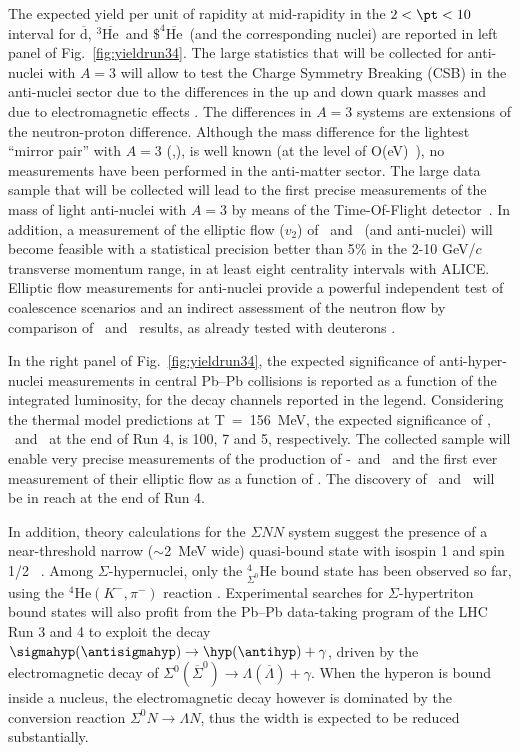 The expected yield per unit of rapidity at mid-rapidity in the $2<\pt<10$ \gmom 
interval for $\overline{\mathrm{d}}$, $^{3}\overline{\mathrm{He}}$~and $\$^{4}\overline{\mathrm{He}}$~(and the corresponding nuclei) 
are reported in left panel of Fig.~\ref{fig:yieldrun34}.
The large statistics that will be collected for anti-nuclei with $A = 3$  will allow 
to test the Charge Symmetry Breaking (CSB) in the anti-nuclei sector due to the differences in the 
up and down quark masses and due to electromagnetic effects \cite{Miller:1990ky}. 
The differences in $A = 3$ systems are extensions of the neutron-proton difference. 
Although the mass difference for the lightest ``mirror pair'' with $A = 3$ (\tritium,\hethree), 
is well known (at the level of O(eV)~\cite{Audi:2002rp}), no measurements have been performed in the anti-matter sector. 
The large data sample that will be collected will lead to the first precise measurements of the mass of light anti-nuclei with $A=3$ by means of the Time-Of-Flight detector~\cite{Adam:2015pna}.
%
In addition, a measurement of the elliptic flow ($v_2$) of \hethree~and \tritium~(and anti-nuclei) will become feasible with a statistical precision better than 5$\%$ in the 2-10 GeV/$c$ transverse momentum range, in at least eight centrality intervals with ALICE. Elliptic flow measurements for anti-nuclei provide a powerful independent test of coalescence scenarios and an indirect assessment of the neutron flow by comparison of \hethree~and \tritium~results, as already tested with deuterons \cite{Acharya:2017dmc}.

In the right panel of Fig.~\ref{fig:yieldrun34}, the expected significance of anti-hyper-nuclei measurements in central Pb--Pb collisions is reported as a function of the integrated luminosity, for the decay channels reported in the legend. 
Considering the thermal model predictions at T~=~156~MeV, the expected significance 
of \antihyp, \antihypfour\ and \antihehypfour\ at the end of Run 4, is 100, 7 and 5, respectively. 
The collected sample will enable very precise measurements of the production of \hyp\ and \antihyp\ and the first ever measurement of their elliptic flow as a function of \pT.
The discovery of \antihypfour\ and \antihehypfour\ will be in reach at the end of Run 4.

In addition, theory calculations for the $\Sigma NN$ system suggest the presence of a near-threshold narrow ($\sim$2~MeV wide) quasi-bound state with isospin 1 and spin 1/2 ~\cite{cite:SigmaTriton-theory}. Among $\Sigma$-hypernuclei, only the $_{\Sigma^0}^{4}\mathrm{He}$ bound state has been observed so far, using the ${^4}\mathrm{He}(K^-,\pi^-)$ reaction \cite{cite:SigmaTriton-data}.
Experimental searches for $\Sigma$-hypertriton bound states will also profit from the Pb--Pb data-taking program of the LHC Run 3 and 4 to exploit the decay
$\sigmahyp (\antisigmahyp) \rightarrow \hyp (\antihyp) + \gamma$, driven by
the electromagnetic decay of 
$\Sigma^{0}(\overline{\Sigma}^{0}) \rightarrow \Lambda(\overline{\Lambda}) + \gamma$.
When the hyperon is bound inside a nucleus, the electromagnetic decay however is dominated by the conversion reaction $\Sigma^{0} N \rightarrow \Lambda N$, thus the width is expected to be reduced substantially.

